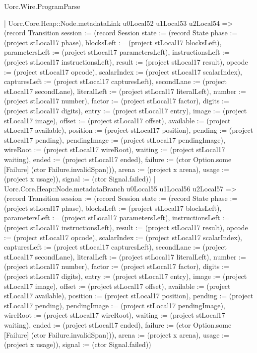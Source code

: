 \begin{lexlean}{Uorc.Wire.ProgramParse}
\begin{semanticmodule}
{          | Uorc.Core.Heap::Node.metadataLink u0Local52 u1Local53 u2Local54 => (record Transition {session := (record Session {state := (record State {phase := (project stLocal17 phase), blocksLeft := (project stLocal17 blocksLeft), parametersLeft := (project stLocal17 parametersLeft), instructionsLeft := (project stLocal17 instructionsLeft), result := (project stLocal17 result), opcode := (project stLocal17 opcode), scalarIndex := (project stLocal17 scalarIndex), capturesLeft := (project stLocal17 capturesLeft), secondLane := (project stLocal17 secondLane), literalLeft := (project stLocal17 literalLeft), number := (project stLocal17 number), factor := (project stLocal17 factor), digits := (project stLocal17 digits), entry := (project stLocal17 entry), image := (project stLocal17 image), offset := (project stLocal17 offset), available := (project stLocal17 available), position := (project stLocal17 position), pending := (project stLocal17 pending), pendingImage := (project stLocal17 pendingImage), wireRoot := (project stLocal17 wireRoot), waiting := (project stLocal17 waiting), ended := (project stLocal17 ended), failure := (ctor Option.some [Failure] (ctor Failure.invalidSpan))}), arena := (project x arena), usage := (project x usage)}), signal := (ctor Signal.failed)})
          | Uorc.Core.Heap::Node.metadataBranch u0Local55 u1Local56 u2Local57 => (record Transition {session := (record Session {state := (record State {phase := (project stLocal17 phase), blocksLeft := (project stLocal17 blocksLeft), parametersLeft := (project stLocal17 parametersLeft), instructionsLeft := (project stLocal17 instructionsLeft), result := (project stLocal17 result), opcode := (project stLocal17 opcode), scalarIndex := (project stLocal17 scalarIndex), capturesLeft := (project stLocal17 capturesLeft), secondLane := (project stLocal17 secondLane), literalLeft := (project stLocal17 literalLeft), number := (project stLocal17 number), factor := (project stLocal17 factor), digits := (project stLocal17 digits), entry := (project stLocal17 entry), image := (project stLocal17 image), offset := (project stLocal17 offset), available := (project stLocal17 available), position := (project stLocal17 position), pending := (project stLocal17 pending), pendingImage := (project stLocal17 pendingImage), wireRoot := (project stLocal17 wireRoot), waiting := (project stLocal17 waiting), ended := (project stLocal17 ended), failure := (ctor Option.some [Failure] (ctor Failure.invalidSpan))}), arena := (project x arena), usage := (project x usage)}), signal := (ctor Signal.failed)})
}
\end{semanticmodule}
\end{lexlean}
